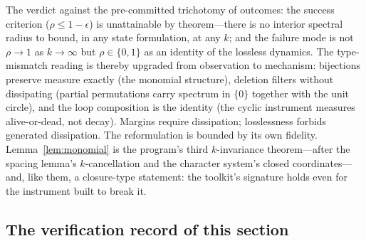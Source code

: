 The verdict against the pre-committed trichotomy of outcomes: the
success criterion ($\rho\le 1-\epsilon$) is unattainable by
theorem---there is no interior spectral radius to bound, in any state
formulation, at any $k$; and the failure mode is not $\rho\to 1$ as
$k\to\infty$ but $\rho\in\{0,1\}$ as an identity of the lossless
dynamics. The type-mismatch reading is thereby upgraded from
observation to mechanism: bijections preserve measure exactly (the
monomial structure), deletion filters without dissipating (partial
permutations carry spectrum in $\{0\}$ together with the unit circle),
and the loop composition is the identity (the cyclic instrument
measures alive-or-dead, not decay). Margins require dissipation;
losslessness forbids generated dissipation. The reformulation is
bounded by its own fidelity. Lemma~\ref{lem:monomial} is the program's
third $k$-invariance theorem---after the spacing lemma's
$k$-cancellation and the character system's closed coordinates---and,
like them, a closure-type statement: the toolkit's signature holds
even for the instrument built to break it.

\subsection{The verification record of this section}\label{sec:scale-sound}

